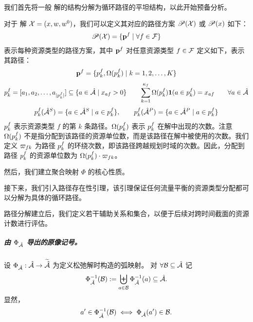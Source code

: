 我们首先将一般 \problemName 解的结构分解为循环路径的平坦结构，以此开始预备分析。

对于 \problemName 解 $\solution = (\fleetAssignVar, \shareVar, \outsideShareVar)$，我们可以定义其对应的路径方案 $\routingPlan(\solution)$ 或 $\routingPlan(\fleetAssignVar)$ 如下：
\[
    \routingPlan(\solution) = \{\route{f}\mid\forall f\in\fleetSet\}
\]
表示每种资源类型的路径方案，其中 $\route{f}$ 对任意资源类型 $f\in\fleetSet$ 定义如下，表示其路径：
\[
    \route{f} = \{\pathInRoute{f}{k}, \routeAmount{\pathInRoute{f}{k}}\mid k=1,2,\ldots,K\}
\]
\[
    \pathInRoute{f}{k} = [a_1, a_2, \ldots, a_{\lvert \pathInRoute{f}{k} \rvert}]
    \subseteq \{a\in\arcSet\mid \fleetAssignVar_{af}>0\}
    \qquad
    \sum_{k=1}^{\fleetAvail_f}\routeAmount{\pathInRoute{f}{k}}\mathbf{1}(a\in\pathInRoute{f}{k}) = \fleetAssignVar_{af}
    \qquad \forall a\in\arcSet
\]
\[
    \pathInRoute{f}{k}(\servingArc) = \{a\in\servingArc\mid a\in\pathInRoute{f}{k}\}
    ,\qquad
    \pathInRoute{f}{k}(\positionArc) = \{a\in\positionArc\mid a\in\pathInRoute{f}{k}\}
\]
$\pathInRoute{f}{k}$ 表示资源类型 $f$ 的第 $k$ 条路径。$\routeAmount{\pathInRoute{f}{k}}$ 表示 $\pathInRoute{f}{k}$ 在解中出现的次数。注意 $\routeAmount{\pathInRoute{f}{k}}$ 不是指分配到该路径的资源单位数，而是该路径在解中被使用的次数。我们定义 $\wrapnum_{fk}$ 为路径 $\pathInRoute{f}{k}$ 的环绕次数，即该路径跨越规划时域的次数。因此，分配到路径 $\pathInRoute{f}{k}$ 的资源单位数为 $\routeAmount{\pathInRoute{f}{k}} \cdot \wrapnum_{fk}$。


然后，我们建立聚合映射 $\Phi$ 的核心性质。


接下来，我们引入路径存在性引理，该引理保证任何流量平衡的资源类型分配都可以分解为具体的循环路径。



路径分解建立后，我们定义若干辅助关系和集合，以便于后续对跨时间截面的资源计数进行评估。

\subparagraph*{由 $\Phi_{\arcSet}$ 导出的原像记号。}
设 $\Phi_{\arcSet}:\full{\arcSet}\to\widetilde{\arcSet}$ 为定义松弛解时构造的弧映射。
对 $\forall \mathcal{B}\subseteq\arcSet$ 记
\[
    \Phi_{\arcSet}^{-1}(\mathcal{B})
        := \biguplus_{a\in\mathcal{B}}\Phi_{\arcSet}^{-1}(a)
        \subseteq \full{\arcSet}.
\]
显然，
\[
    a'\in\Phi_{\arcSet}^{-1}(\mathcal{B})
        \iff \Phi_{\arcSet}(a')\in\mathcal{B}.
\]

